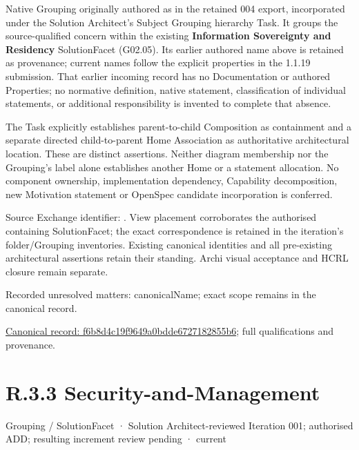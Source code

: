 Native Grouping originally authored as \texttt{} in the retained 004 export,
incorporated under the Solution Architect's Subject Grouping hierarchy Task.
It groups the source-qualified \texttt{} concern within
the existing \textbf{Information Sovereignty and Residency} SolutionFacet (G02.05). Its earlier authored name above is retained as provenance; current names
follow the explicit properties in the 1.1.19 submission.
That earlier incoming record has no Documentation or authored Properties; no normative
definition, native statement, classification of individual statements, or
additional responsibility is invented to complete that absence.



The Task explicitly establishes parent-to-child Composition as containment and
a separate directed child-to-parent Home Association as authoritative architectural
location. These are distinct assertions. Neither diagram membership nor the
Grouping's label alone establishes another Home or a statement allocation.
No component ownership, implementation dependency, Capability decomposition,
new Motivation statement or OpenSpec candidate incorporation is conferred.



Source Exchange identifier: \texttt{}. View placement corroborates
the authorised containing SolutionFacet; the exact correspondence is retained in the
iteration's folder/Grouping inventories. Existing canonical identities and all
pre-existing architectural assertions retain their standing. Archi visual
acceptance and HCRL closure remain separate.


{\small Recorded unresolved matters: canonicalName; exact scope remains in the canonical record.}\par
{\footnotesize \href{../../../../../../../continuum/grouping/f6b8d4c19f9649a0bdde6727182855b6.md}{Canonical record: f6b8d4c19f9649a0bdde6727182855b6}; full qualifications and provenance.}\par
\section*{R.3.3 Security-and-Management}
\label{navigation:R.3.3}

\label{element:a762424d13254eaa9467946d9d7355f8}
{\small Grouping / SolutionFacet · Solution Architect-reviewed Iteration 001; authorised ADD; resulting increment review pending · current}\par

